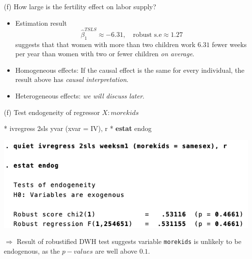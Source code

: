 \documentclass[
  10pt,
  ignorenonframetext,
]{beamer}
\newenvironment{Shaded}{\begin{snugshade}}{\end{snugshade}}
\newcommand{\FunctionTok}[1]{\textcolor[rgb]{0.00,0.00,0.00}{#1}}
\newcommand{\KeywordTok}[1]{\textcolor[rgb]{0.13,0.29,0.53}{\textbf{#1}}}
\newcommand{\NormalTok}[1]{#1}
\begin{document}
\begin{frame}{(f) How large is the fertility effect on labor supply?}
\protect\hypertarget{f-how-large-is-the-fertility-effect-on-labor-supply}{}
\begin{itemize}
\item
  Estimation result \[
  \hat{\beta}_1^{TSLS} \approx -6.31, \quad \text{robust s.e} \approx 1.27 
  \] suggests that that women with more than two children work \(6.31\)
  fewer weeks per year than women with two or fewer children \emph{on
  average}. \vspace{1mm}
\item
  Homogeneous effects: If the causal effect is the same for every
  individual, the result above has \emph{causal interpretation}.
  \vspace{1mm}
\item
  Heterogeneous effects: \emph{we will discuss later}.
\end{itemize}
\end{frame}

\begin{frame}[fragile]{(f) Test endogeneity of regressor \(X:morekids\)}
\protect\hypertarget{f-test-endogeneity-of-regressor-xmorekids}{}
\begin{Shaded}
\begin{Highlighting}[]
\NormalTok{* ivregress 2sls yvar (xvar = IV), }\FunctionTok{r}
\NormalTok{* }\KeywordTok{estat}\NormalTok{ endog}
\end{Highlighting}
\end{Shaded}

\begin{center}\includegraphics[width=0.7\linewidth]{pictures/res5-estatEndog} \end{center}

\(\Rightarrow\) Result of robustified DWH test suggests variable
\texttt{morekids} is unlikely to be endogenous, as the \(p-values\) are
well above \(0.1\).
\end{frame}
\end{document}
